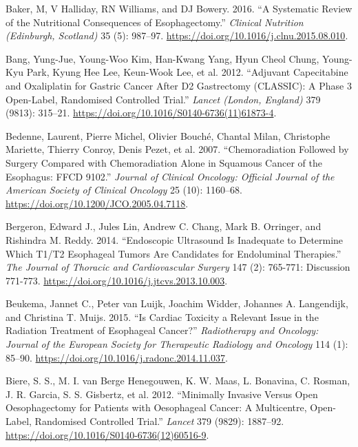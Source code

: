 \documentclass[
  letterpaper,
]{scrbook}
\newlength{\cslhangindent}
\newenvironment{CSLReferences}[2] %
 {\begin{list}{}{%
  \setlength{\itemindent}{0pt}
  \setlength{\leftmargin}{0pt}
  \setlength{\parsep}{0pt}
  \ifodd #1
   \setlength{\leftmargin}{\cslhangindent}
   \setlength{\itemindent}{-1\cslhangindent}
  \fi
  \setlength{\itemsep}{#2\baselineskip}}}
 {\end{list}}
\begin{document}
\begin{CSLReferences}{1}{0}
Baker, M, V Halliday, RN Williams, and DJ Bowery. 2016. {``A Systematic
Review of the Nutritional Consequences of Esophagectomy.''}
\emph{Clinical Nutrition (Edinburgh, Scotland)} 35 (5): 987--97.
\url{https://doi.org/10.1016/j.clnu.2015.08.010}.

Bang, Yung-Jue, Young-Woo Kim, Han-Kwang Yang, Hyun Cheol Chung,
Young-Kyu Park, Kyung Hee Lee, Keun-Wook Lee, et al. 2012. {``Adjuvant
Capecitabine and Oxaliplatin for Gastric Cancer After {D2} Gastrectomy
({CLASSIC}): A Phase 3 Open-Label, Randomised Controlled Trial.''}
\emph{Lancet (London, England)} 379 (9813): 315--21.
\url{https://doi.org/10.1016/S0140-6736(11)61873-4}.

Bedenne, Laurent, Pierre Michel, Olivier Bouché, Chantal Milan,
Christophe Mariette, Thierry Conroy, Denis Pezet, et al. 2007.
{``Chemoradiation Followed by Surgery Compared with Chemoradiation Alone
in Squamous Cancer of the Esophagus: {FFCD} 9102.''} \emph{Journal of
Clinical Oncology: Official Journal of the American Society of Clinical
Oncology} 25 (10): 1160--68.
\url{https://doi.org/10.1200/JCO.2005.04.7118}.

Bergeron, Edward J., Jules Lin, Andrew C. Chang, Mark B. Orringer, and
Rishindra M. Reddy. 2014. {``Endoscopic Ultrasound Is Inadequate to
Determine Which {T1}/{T2} Esophageal Tumors Are Candidates for
Endoluminal Therapies.''} \emph{The Journal of Thoracic and
Cardiovascular Surgery} 147 (2): 765-771: Discussion 771-773.
\url{https://doi.org/10.1016/j.jtcvs.2013.10.003}.

Beukema, Jannet C., Peter van Luijk, Joachim Widder, Johannes A.
Langendijk, and Christina T. Muijs. 2015. {``Is Cardiac Toxicity a
Relevant Issue in the Radiation Treatment of Esophageal Cancer?''}
\emph{Radiotherapy and Oncology: Journal of the European Society for
Therapeutic Radiology and Oncology} 114 (1): 85--90.
\url{https://doi.org/10.1016/j.radonc.2014.11.037}.

Biere, S. S., M. I. van Berge Henegouwen, K. W. Maas, L. Bonavina, C.
Rosman, J. R. Garcia, S. S. Gisbertz, et al. 2012. {``Minimally Invasive
Versus Open Oesophagectomy for Patients with Oesophageal Cancer: A
Multicentre, Open-Label, Randomised Controlled Trial.''} \emph{Lancet}
379 (9829): 1887--92.
\url{https://doi.org/10.1016/S0140-6736(12)60516-9}.


\end{CSLReferences}
\end{document}
